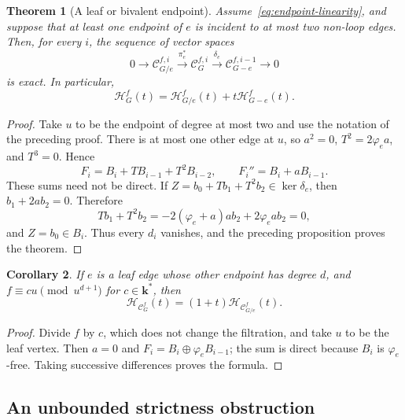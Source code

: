 \documentclass[reqno]{article}
\theoremstyle{plain} %
\newtheorem{theorem}{Theorem}[section]
\newtheorem{corollary}[theorem]{Corollary}
\theoremstyle{definition}
\theoremstyle{remark}
\newcommand{\K} {\mathbf{k}}
\newcommand {\CC}{\mathscr{C}}
\newcommand{\hs}{\mathscr{H}}
\numberwithin{equation}{section}
\begin{document}
\begin{theorem}[A leaf or bivalent endpoint]\label{th:del-contr}
Assume~\eqref{eq:endpoint-linearity}, and suppose that at least one
endpoint of $e$ is incident to at most two non-loop edges.
Then, for every $i$, the sequence of vector spaces
\begin{equation}\label{eq:filtered-exact}
0\longrightarrow\CC_{G/e}^{f,i}\xrightarrow{\pi_e^*}
\CC_G^{f,i}\xrightarrow{\delta_e}\CC_{G-e}^{f,i-1}
\longrightarrow0
\end{equation}
is exact. In particular,
\begin{equation}\label{eq:del-contr}
\hs_G^f(t)=\hs_{G/e}^f(t)+t\hs_{G-e}^f(t).
\end{equation}
\end{theorem}
\begin{proof}
Take $u$ to be the endpoint of degree at most two and use the notation
of the preceding proof. There is at most one other edge at $u$, so
$a^2=0$, $T^2=2\varphi_ea$, and $T^3=0$. Hence
\begin{equation}\label{eq:bivalent-filtrations}
F_i=B_i+TB_{i-1}+T^2B_{i-2},\qquad F_i''=B_i+aB_{i-1}.
\end{equation}
These sums need not be direct. If
$Z=b_0+Tb_1+T^2b_2\in\ker\delta_e$, then
$b_1+2ab_2=0$. Therefore
\[
Tb_1+T^2b_2=-2(\varphi_e+a)ab_2+2\varphi_eab_2=0,
\]
and $Z=b_0\in B_i$. Thus every $d_i$ vanishes, and the preceding
proposition proves the theorem.
\end{proof}

\begin{corollary}\label{cor:tail}
If $e$ is a leaf edge whose other endpoint has degree $d$, and
$f\equiv cu\pmod{u^{d+1}}$ for $c\in\K^*$, then
\begin{equation}\label{eq:leaf-hs}
\hs_{\CC_G^f}(t)=(1+t)\hs_{\CC_{G/e}^f}(t).
\end{equation}
\end{corollary}
\begin{proof}
Divide $f$ by $c$, which does not change the filtration, and take $u$
to be the leaf vertex. Then $a=0$ and
$F_i=B_i\oplus\varphi_eB_{i-1}$; the sum is direct because $B_i$ is
$\varphi_e$-free. Taking successive differences proves the formula.
\end{proof}

\subsection{An unbounded strictness obstruction}
\label{sec:strictness-counterexample}
\end{document}
